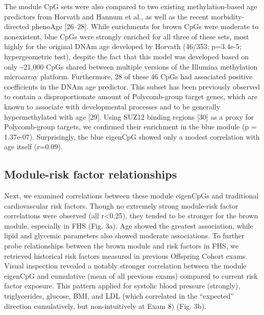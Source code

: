 \documentclass[]{bmcart}
\begin{document}
The module CpG sets were also compared to two existing methylation-based
age predictors from Horvath and Hannum et al., as well as the recent
morbidity-directed phenoAge {[}26--28{]}. While enrichments for brown
CpGs were moderate to nonexistent, blue CpGs were strongly enriched for
all three of these sets, most highly for the original DNAm age developed
by Horvath (46/353; p=3.4e-5; hypergeometric test), despite the fact
that this model was developed based on only \textasciitilde{}21,000 CpGs
shared between multiple versions of the Illumina methylation microarray
platform. Furthermore, 28 of these 46 CpGs had associated positive
coefficients in the DNAm age predictor. This subset has been previously
observed to contain a disproportionate amount of Polycomb-group target
genes, which are known to associate with developmental processes and to
be generally hypermethylated with age {[}29{]}. Using SUZ12 binding
regions {[}30{]} as a proxy for Polycomb-group targets, we confirmed
their enrichment in the blue module (p = 1.37e-07). Surprisingly, the
blue eigenCpG showed only a modest correlation with age itself (r=0.09).

\subsection{Module-risk factor
relationships}\label{module-risk-factor-relationships}

Next, we examined correlations between these module eigenCpGs and
traditional cardiovascular risk factors. Though no extremely strong
module-risk factor correlations were observed (all
\textbar{}r\textbar{}\textless{}0.25), they tended to be stronger for
the brown module, especially in FHS (Fig. 3a). Age showed the greatest
association, while lipid and glycemic parameters also showed moderate
associations. To further probe relationships between the brown module
and risk factors in FHS, we retrieved historical risk factors measured
in previous Offspring Cohort exams. Visual inspection revealed a notably
stronger correlation between the module eigenCpG and cumulative (mean of
all previous exams) compared to current risk factor exposure. This
pattern applied for systolic blood pressure (strongly), triglycerides,
glucose, BMI, and LDL (which correlated in the ``expected'' direction
cumulatively, but non-intuitively at Exam 8) (Fig. 3b).
\end{document}
